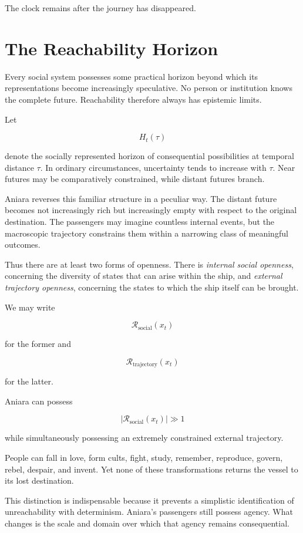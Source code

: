 \documentclass[11pt,oneside]{book}
\theoremstyle{definition}
\theoremstyle{remark}
\newcommand{\R}{\mathcal{R}}
\begin{document}
The clock remains after the journey has disappeared.

\section{The Reachability Horizon}

Every social system possesses some practical horizon beyond which its representations become increasingly speculative. No person or institution knows the complete future. Reachability therefore always has epistemic limits.

Let

\[
H_t(\tau)
\]

denote the socially represented horizon of consequential possibilities at temporal distance \(\tau\). In ordinary circumstances, uncertainty tends to increase with \(\tau\). Near futures may be comparatively constrained, while distant futures branch.

Aniara reverses this familiar structure in a peculiar way. The distant future becomes not increasingly rich but increasingly empty with respect to the original destination. The passengers may imagine countless internal events, but the macroscopic trajectory constrains them within a narrowing class of meaningful outcomes.

Thus there are at least two forms of openness. There is \emph{internal social openness}, concerning the diversity of states that can arise within the ship, and \emph{external trajectory openness}, concerning the states to which the ship itself can be brought.

We may write

\[
\R_{\mathrm{social}}(x_t)
\]

for the former and

\[
\R_{\mathrm{trajectory}}(x_t)
\]

for the latter.

Aniara can possess

\[
|\R_{\mathrm{social}}(x_t)|\gg1
\]

while simultaneously possessing an extremely constrained external trajectory.

People can fall in love, form cults, fight, study, remember, reproduce, govern, rebel, despair, and invent. Yet none of these transformations returns the vessel to its lost destination.

This distinction is indispensable because it prevents a simplistic identification of unreachability with determinism. Aniara's passengers still possess agency. What changes is the scale and domain over which that agency remains consequential.
\end{document}
